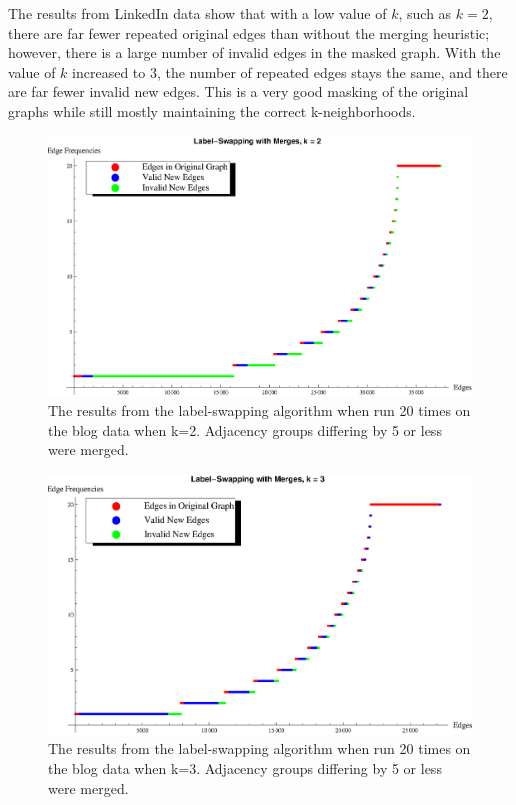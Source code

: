 \indent The results from LinkedIn data show that with a low value of $k$, such as $k=2$, there are far fewer repeated original edges than without the merging heuristic; however, there is a large number of invalid edges in the masked graph. With the value of $k$ increased to $3$, the number of repeated edges stays the same, and there are far fewer invalid new edges. This is a very good masking of the original graphs while still mostly maintaining the correct k-neighborhoods.

\begin{figure}[ht]
  \centering
  \includegraphics[scale=0.8 ]{s40_k_2_det_graph.eps}
  \caption{The results from the label-swapping algorithm when run 20 times on the blog data when k=2. Adjacency groups differing by 5 or less were merged.}
  \label{fig:s40-k=2-merge}
\end{figure}

\begin{figure}[ht]
  \centering
  \includegraphics[scale=0.8]{s40_k_3_det_graph.eps}
  \caption{The results from the label-swapping algorithm when run 20 times on the blog data when k=3. Adjacency groups differing by 5 or less were merged.}
  \label{fig:s40-k=3-merge}
\end{figure}
